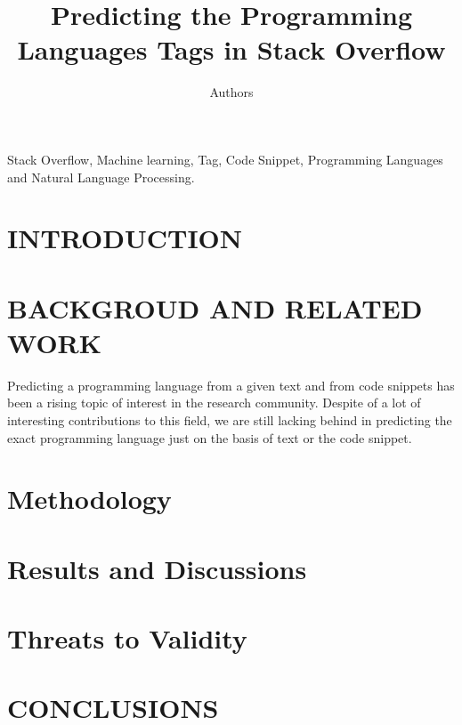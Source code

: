 \documentclass[letterpaper, 10 pt, conference]{ieeeconf}  %
\title{\LARGE \bf
Predicting the Programming Languages Tags in Stack Overflow
}
\author{Authors}
\begin{document}
\maketitle
\thispagestyle{empty}
\pagestyle{empty}
\begin{abstract} %
 

\medbreak
\end{abstract}

\begin{keywords}
Stack Overflow, Machine learning, Tag, Code Snippet, Programming Languages and Natural Language Processing.
\end{keywords}
\medbreak
\section{INTRODUCTION}

\section{BACKGROUD AND RELATED WORK}
Predicting a programming language from a given text and from code snippets has been a rising topic of interest in the research community. Despite of a lot of interesting contributions to this field, we are still lacking behind in predicting the exact programming language just on the basis of text or the code snippet. 

\section{Methodology}


\section{Results and Discussions}%


\section{Threats to Validity}


\section{CONCLUSIONS}%
\end{document}
